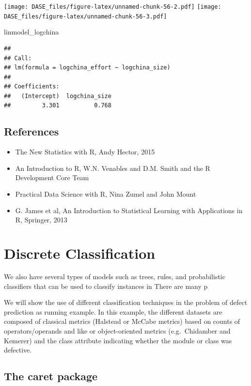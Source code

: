 \documentclass[]{book}
\newenvironment{Shaded}{\begin{snugshade}}{\end{snugshade}}
\newcommand{\NormalTok}[1]{{#1}}
\providecommand{\tightlist}{%
  \setlength{\itemsep}{0pt}\setlength{\parskip}{0pt}}
\begin{document}
\texttt{[image: DASE\_files/figure-latex/unnamed-chunk-56-2.pdf]}
\texttt{[image: DASE\_files/figure-latex/unnamed-chunk-56-3.pdf]}

\begin{Shaded}
\begin{Highlighting}[]
\NormalTok{linmodel_logchina}
\end{Highlighting}
\end{Shaded}

\begin{verbatim}
## 
## Call:
## lm(formula = logchina_effort ~ logchina_size)
## 
## Coefficients:
##   (Intercept)  logchina_size  
##         3.301          0.768
\end{verbatim}

\section{References}\label{references}

\begin{itemize}
\tightlist
\item
  The New Statistics with R, Andy Hector, 2015
\item
  An Introduction to R, W.N. Venables and D.M. Smith and the R
  Development Core Team
\item
  Practical Data Science with R, Nina Zumel and John Mount
\item
  G. James et al, An Introduction to Statistical Learning with
  Applications in R, Springer, 2013
\end{itemize}

\chapter{Discrete Classification}\label{discrete-classification}

We also have several types of models such as trees, rules, and
probabilistic classifiers that can be used to classify instances in
There are many p

We will show the use of different classification techniques in the
problem of defect prediction as running example. In this example, the
different datasets are composed of classical metrics (Halstead or McCabe
metrics) based on counts of operators/operands and like or
object-oriented metrics (e.g.~Chidamber and Kemerer) and the class
attribute indicating whether the module or class was defective.

\section{The caret package}\label{the-caret-package}
\end{document}
